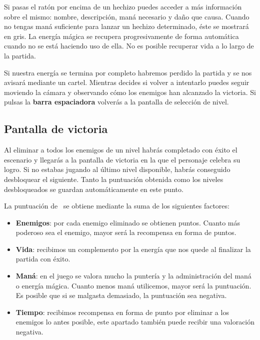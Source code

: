 \documentclass[a4paper,11pt]{article}
\begin{document}
Si pasas el ratón por encima de un hechizo puedes acceder a más información
sobre el mismo: nombre, descripción, maná necesario y daño que causa. Cuando
no tengas maná suficiente para lanzar un hechizo determinado, éste se mostrará
en gris. La energía mágica se recupera progresivamente de forma automática
cuando no se está haciendo uso de ella. No es posible recuperar vida a lo largo
de la partida.


Si nuestra energía se termina por completo habremos perdido la partida y se
nos avisará mediante un cartel. Mientras decides si volver a intentarlo
puedes seguir moviendo la cámara y observando cómo los enemigos han alcanzado
la victoria. Si pulsas la \textbf{barra espaciadora} volverás a la pantalla
de selección de nivel.


\subsection{Pantalla de victoria}

Al eliminar a todos los enemigos de un nivel habrás completado con éxito
el escenario y llegarás a la pantalla de victoria en la que el personaje
celebra su logro. Si no estabas jugando al último nivel disponible, 
habrás conseguido desbloquear el siguiente. Tanto la puntuación obtenida
como los niveles desbloqueados se guardan automáticamente en este punto.


La puntuación de \juego\ se obtiene mediante la suma de los siguientes
factores:

\begin{itemize}
    \itemsep0em
    \item \textbf{Enemigos}: por cada enemigo eliminado se obtienen puntos.
    Cuanto más poderoso sea el enemigo, mayor será la recompensa en forma de puntos.
    \item \textbf{Vida}: recibimos un complemento por la energía que nos quede
    al finalizar la partida con éxito.
    \item \textbf{Maná}: en el juego se valora mucho la puntería y la administración
    del maná o energía mágica. Cuanto menos maná utilicemos, mayor será la puntuación.
    Es posible que si se malgasta demasiado, la puntuación sea negativa.
    \item \textbf{Tiempo}: recibimos recompensa en forma de punto por
    eliminar a los enemigos lo antes posible, este apartado también puede
    recibir una valoración negativa.
\end{itemize}
\end{document}
